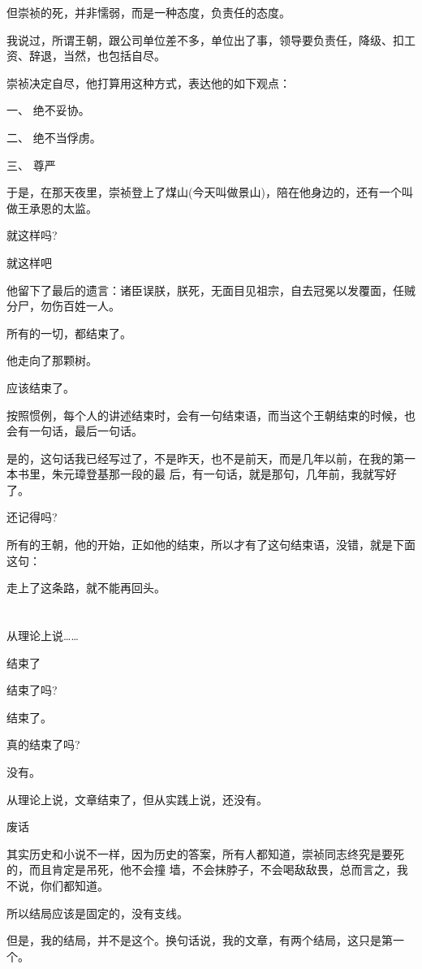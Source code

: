 \documentclass[11pt,a4paper,onecolumn]{article}
\begin{document}
但崇祯的死，并非懦弱，而是一种态度，负责任的态度。

我说过，所谓王朝，跟公司单位差不多，单位出了事，领导要负责任，降级、扣工资、辞退，当然，也包括自尽。

崇祯决定自尽，他打算用这种方式，表达他的如下观点：

一、 绝不妥协。

二、 绝不当俘虏。

三、 尊严

于是，在那天夜里，崇祯登上了煤山(今天叫做景山)，陪在他身边的，还有一个叫做王承恩的太监。

就这样吗?

就这样吧

他留下了最后的遗言：诸臣误朕，朕死，无面目见祖宗，自去冠冕以发覆面，任贼分尸，勿伤百姓一人。

所有的一切，都结束了。

他走向了那颗树。

应该结束了。

按照惯例，每个人的讲述结束时，会有一句结束语，而当这个王朝结束的时候，也会有一句话，最后一句话。

是的，这句话我已经写过了，不是昨天，也不是前天，而是几年以前，在我的第一本书里，朱元璋登基那一段的最
后，有一句话，就是那句，几年前，我就写好了。

还记得吗?

所有的王朝，他的开始，正如他的结束，所以才有了这句结束语，没错，就是下面这句：

走上了这条路，就不能再回头。

\section[\thesection]{}

从理论上说……

结束了

结束了吗?

结束了。

真的结束了吗?

没有。

从理论上说，文章结束了，但从实践上说，还没有。

废话

其实历史和小说不一样，因为历史的答案，所有人都知道，崇祯同志终究是要死的，而且肯定是吊死，他不会撞
墙，不会抹脖子，不会喝敌敌畏，总而言之，我不说，你们都知道。

所以结局应该是固定的，没有支线。

但是，我的结局，并不是这个。换句话说，我的文章，有两个结局，这只是第一个。
\end{document}
